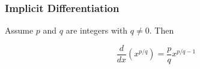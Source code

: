%
%
%

\subsubsection{Implicit Differentiation}
Assume $p$ and $q$ are integers with $q \neq 0$. Then 

\begin{equation}
    \frac{d}{dx}\left( x^{p/q} \right) = \frac{p}{q} x^{p/q - 1}
\end{equation}
